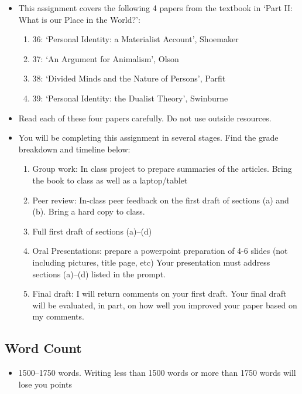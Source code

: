 \documentclass[10pt]{article}
\providecommand{\tightlist}{%
  \setlength{\itemsep}{0pt}\setlength{\parskip}{0pt}}
\begin{document}
\begin{itemize}
\item
  This assignment covers the following 4 papers from the textbook in
  `Part II: What is our Place in the World?':

  \begin{enumerate}
  \def\labelenumi{\arabic{enumi}.}
  \tightlist
  \item
    36: `Personal Identity: a Materialist Account', Shoemaker
  \item
    37: `An Argument for Animalism', Olson
  \item
    38: `Divided Minds and the Nature of Persons', Parfit
  \item
    39: `Personal Identity: the Dualist Theory', Swinburne
  \end{enumerate}
\item
  Read each of these four papers carefully. Do not use outside
  resources.
\item
  You will be completing this assignment in several stages. Find the
  grade breakdown and timeline below:

  \begin{enumerate}
  \def\labelenumi{\arabic{enumi}.}
  \tightlist
  \item
    Group work: In class project to prepare summaries of the articles.
    Bring the book to class as well as a laptop/tablet
  \item
    Peer review: In-class peer feedback on the first draft of sections
    (a) and (b). Bring a hard copy to class.
  \item
    Full first draft of sections (a)--(d)
  \item
    Oral Presentations: prepare a powerpoint preparation of 4-6 slides
    (not including pictures, title page, etc) Your presentation must
    address sections (a)--(d) listed in the prompt.
  \item
    Final draft: I will return comments on your first draft. Your final
    draft will be evaluated, in part, on how well you improved your
    paper based on my comments.
  \end{enumerate}
\end{itemize}

\subsection{Word Count}\label{word-count}

\begin{itemize}
\tightlist
\item
  1500--1750 words. Writing less than 1500 words or more than 1750 words
  will lose you points
\end{itemize}
\end{document}
